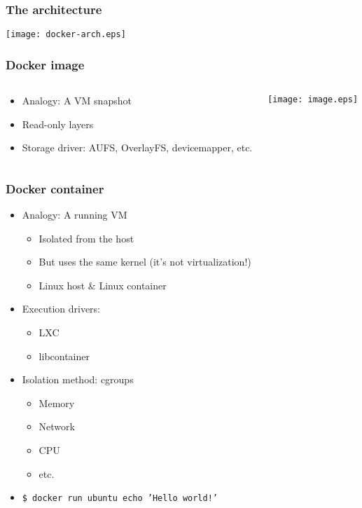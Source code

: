 \documentclass[xetex,mathserif,serif]{beamer}
\begin{document}
  \begin{frame}
    \frametitle{The architecture}
    \texttt{[image: docker-arch.eps]}
  \end{frame}
  \begin{frame}
    \frametitle{Docker image}
    \begin{columns}
      \begin{column}{0.5\textwidth}
        \begin{itemize}
          \item Analogy: A VM snapshot
          \item Read-only layers
          \item Storage driver: AUFS, OverlayFS, devicemapper, etc.
        \end{itemize}
      \end{column}
      \begin{column}{0.5\textwidth}
        \texttt{[image: image.eps]}
      \end{column}
    \end{columns}
  \end{frame}
  \begin{frame}
    \frametitle{Docker container}
    \begin{itemize}
      \item Analogy: A running VM
        \begin{itemize}
          \item Isolated from the host
          \item But uses the same kernel (it's not virtualization!)
          \item Linux host \& Linux container
        \end{itemize}
      \item Execution drivers:
        \begin{itemize}
          \item LXC
          \item libcontainer
        \end{itemize}
      \item Isolation method: cgroups
      \begin{itemize}
        \item Memory
        \item Network
        \item CPU
        \item etc.
      \end{itemize}
    \item \texttt{\$ docker run ubuntu echo 'Hello world!'}
    \end{itemize}
  \end{frame}
\end{document}
